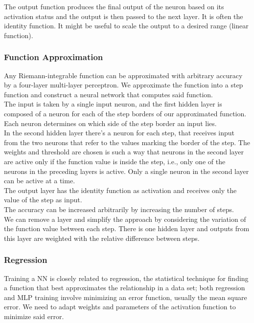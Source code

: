 The output function produces the final output of the neuron based on its activation status and the output is then passed to the next layer. It is often the identity function. It might be useful to scale the output to a desired range (linear function).\\

\subsubsection{Function Approximation}
Any Riemann-integrable function can be approximated with arbitrary accuracy by a four-layer multi-layer perceptron. We approximate the function into a step function and construct a neural network that computes said function.\\

The input is taken by a single input neuron, and the first hidden layer is composed of a neuron for each of the step borders of our approximated function. Each neuron determines on which side of the step border an input lies.\\
In the second hidden layer there's a neuron for each step, that receives input from the two neurons that refer to the values marking the border of the step. The weights and threshold are chosen is such a way that neurons in the second layer are active only if the function value is inside the step, i.e., only one of the neurons in the preceding layers is active. Only a single neuron in the second layer can be active at a time.\\
The output layer has the identity function as activation and receives only the value of the step as input.\\

The accuracy can be increased arbitrarily by increasing the number of steps.\\

We can remove a layer and simplify the approach by considering the variation of the function value between each step. There is one hidden layer and outputs from this layer are weighted with the relative difference between steps.\\

\subsubsection{Regression}
Training a NN is closely related to regression, the statistical technique for finding a function that best approximates the relationship in a data set; both regression and MLP training involve minimizing an error function, usually the mean square error. We need to adapt weights and parameters of the activation function to minimize said error.\\

